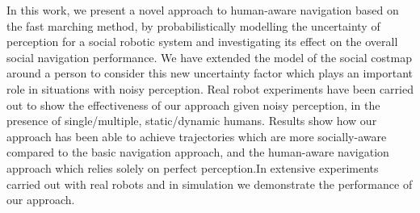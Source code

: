 In this work, we present a novel approach to human-aware navigation based on the fast marching method, by probabilistically modelling the uncertainty of perception for a social robotic system and investigating its effect on the overall social navigation performance. We have extended the model of the social costmap around a person to consider this new uncertainty factor which plays an important role in situations with noisy perception.  
Real robot experiments have been carried out to show the effectiveness of our approach given noisy perception, in the presence of single/multiple, static/dynamic humans. Results show how our approach has been able to achieve trajectories which are more socially-aware compared to the basic navigation approach, and the human-aware navigation approach which relies solely on perfect perception.In extensive experiments carried out with real robots and
in simulation we demonstrate the performance of our approach.
